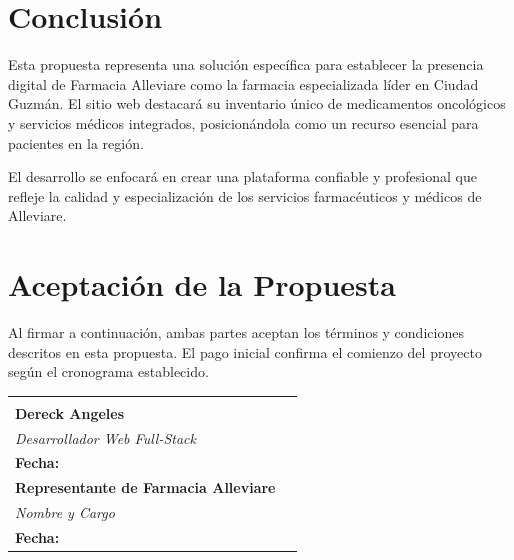 \documentclass[12pt,a4paper]{article}
\begin{document}
\section{Conclusión}

Esta propuesta representa una solución específica para establecer la presencia digital de Farmacia Alleviare como la farmacia especializada líder en Ciudad Guzmán. El sitio web destacará su inventario único de medicamentos oncológicos y servicios médicos integrados, posicionándola como un recurso esencial para pacientes en la región.

El desarrollo se enfocará en crear una plataforma confiable y profesional que refleje la calidad y especialización de los servicios farmacéuticos y médicos de Alleviare.

\section{Aceptación de la Propuesta}

Al firmar a continuación, ambas partes aceptan los términos y condiciones descritos en esta propuesta. El pago inicial confirma el comienzo del proyecto según el cronograma establecido.

\vspace{3cm}

\begin{tabularx}{\textwidth}{X X}
    \begin{center}
        \hrulefill \\
        \vspace{0.2cm}
        \textbf{Dereck Angeles} \\
        \textit{Desarrollador Web Full-Stack} \\[1.5cm]
        \textbf{Fecha:} \underline{\hspace{4cm}}
    \end{center} &
    \begin{center}
        \hrulefill \\
        \vspace{0.2cm}
        \textbf{Representante de Farmacia Alleviare} \\
        \textit{Nombre y Cargo} \\[1.5cm]
        \textbf{Fecha:} \underline{\hspace{4cm}}
    \end{center} \\
\end{tabularx}
\end{document}

